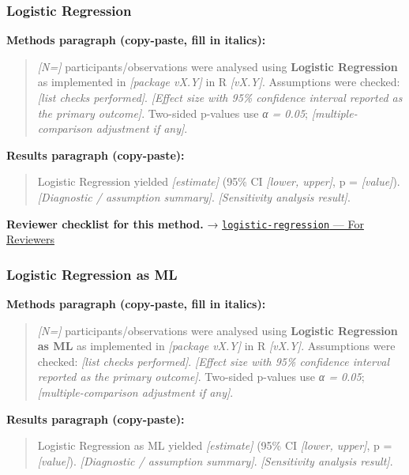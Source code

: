 \documentclass[
]{article}
\begin{document}
\subsubsection{Logistic Regression}\label{logistic-regression}

\textbf{Methods paragraph (copy-paste, fill in italics):}

\begin{quote}
\emph{{[}N={]}} participants/observations were analysed using
\textbf{Logistic Regression} as implemented in \emph{{[}package vX.Y{]}}
in R \emph{{[}vX.Y{]}}. Assumptions were checked: \emph{{[}list checks
performed{]}}. \emph{{[}Effect size with 95\% confidence interval
reported as the primary outcome{]}}. Two-sided p-values use \emph{α =
0.05}; \emph{{[}multiple-comparison adjustment if any{]}}.
\end{quote}

\textbf{Results paragraph (copy-paste):}

\begin{quote}
Logistic Regression yielded \emph{{[}estimate{]}} (95\% CI
\emph{{[}lower, upper{]}}, p = \emph{{[}value{]}}). \emph{{[}Diagnostic
/ assumption summary{]}}. \emph{{[}Sensitivity analysis result{]}}.
\end{quote}

\textbf{Reviewer checklist for this method.} →
\href{../chapters/07-regression/logistic-regression.Rmd\#for-reviewers}{\texttt{logistic-regression}
--- For Reviewers}

\subsubsection{Logistic Regression as
ML}\label{logistic-regression-as-ml}

\textbf{Methods paragraph (copy-paste, fill in italics):}

\begin{quote}
\emph{{[}N={]}} participants/observations were analysed using
\textbf{Logistic Regression as ML} as implemented in \emph{{[}package
vX.Y{]}} in R \emph{{[}vX.Y{]}}. Assumptions were checked: \emph{{[}list
checks performed{]}}. \emph{{[}Effect size with 95\% confidence interval
reported as the primary outcome{]}}. Two-sided p-values use \emph{α =
0.05}; \emph{{[}multiple-comparison adjustment if any{]}}.
\end{quote}

\textbf{Results paragraph (copy-paste):}

\begin{quote}
Logistic Regression as ML yielded \emph{{[}estimate{]}} (95\% CI
\emph{{[}lower, upper{]}}, p = \emph{{[}value{]}}). \emph{{[}Diagnostic
/ assumption summary{]}}. \emph{{[}Sensitivity analysis result{]}}.
\end{quote}
\end{document}
